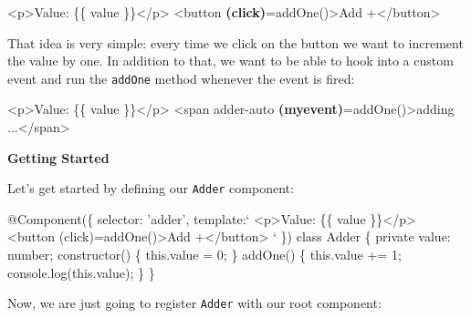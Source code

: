 \documentclass[12pt,]{article}
\newenvironment{Shaded}{}{}
\newcommand{\KeywordTok}[1]{\textcolor[rgb]{0.00,0.00,1.00}{{#1}}}
\newcommand{\DecValTok}[1]{{#1}}
\newcommand{\StringTok}[1]{\textcolor[rgb]{0.00,0.50,0.50}{{#1}}}
\newcommand{\OtherTok}[1]{\textcolor[rgb]{1.00,0.25,0.00}{{#1}}}
\newcommand{\FunctionTok}[1]{{#1}}
\newcommand{\ErrorTok}[1]{\textcolor[rgb]{1.00,0.00,0.00}{\textbf{{#1}}}}
\newcommand{\NormalTok}[1]{{#1}}
\begin{document}
\begin{Shaded}
\begin{Highlighting}[numbers=left,,]
\KeywordTok{<p>}\NormalTok{Value: \{\{ value \}\}}\KeywordTok{</p>}
\KeywordTok{<button} \ErrorTok{(click)}\OtherTok{=}\StringTok{addOne()}\KeywordTok{>}\NormalTok{Add +}\KeywordTok{</button>}
\end{Highlighting}
\end{Shaded}

That idea is very simple: every time we click on the button we want to
increment the value by one. In addition to that, we want to be able to
hook into a custom event and run the \texttt{addOne} method whenever the
event is fired:

\begin{Shaded}
\begin{Highlighting}[numbers=left,,]
\KeywordTok{<p>}\NormalTok{Value: \{\{ value \}\}}\KeywordTok{</p>}
\KeywordTok{<span}\OtherTok{ adder-auto} \ErrorTok{(myevent)}\OtherTok{=}\StringTok{addOne()}\KeywordTok{>}\NormalTok{adding ...}\KeywordTok{</span>}
\end{Highlighting}
\end{Shaded}

\textbf{Getting Started}

Let's get started by defining our \texttt{Adder} component:

\begin{Shaded}
\begin{Highlighting}[numbers=left,,]
\FunctionTok{@Component}\NormalTok{(\{}
  \NormalTok{selector: 'adder',}
  \NormalTok{template:`}
  \NormalTok{<p>Value: \{\{ value \}\}</p>}
  \NormalTok{<}\FunctionTok{button} \NormalTok{(click)=}\FunctionTok{addOne}\NormalTok{()>Add +</button>}
  \NormalTok{`}
\NormalTok{\})}
\KeywordTok{class} \NormalTok{Adder \{}
  \KeywordTok{private} \NormalTok{value: number;}
  \FunctionTok{constructor}\NormalTok{() \{}
    \KeywordTok{this}\NormalTok{.}\FunctionTok{value} \NormalTok{= }\DecValTok{0}\NormalTok{;}
  \NormalTok{\}}
  \FunctionTok{addOne}\NormalTok{() \{}
  \KeywordTok{this}\NormalTok{.}\FunctionTok{value} \NormalTok{+= }\DecValTok{1}\NormalTok{;}
  \NormalTok{console.}\FunctionTok{log}\NormalTok{(}\KeywordTok{this}\NormalTok{.}\FunctionTok{value}\NormalTok{);}
  \NormalTok{\}}
\NormalTok{\}}
\end{Highlighting}
\end{Shaded}

Now, we are just going to register \texttt{Adder} with our root
component:
\end{document}
